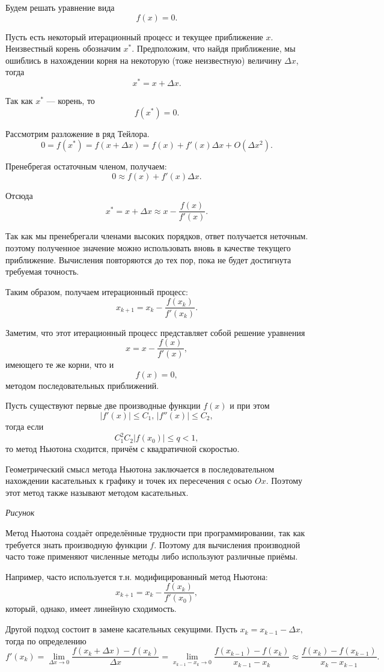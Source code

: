 Будем решать уравнение вида 
\[
f(x)=0.
\]


Пусть есть некоторый итерационный процесс и текущее приближение $x$.
Неизвестный корень обозначим $x^{*}$. Предположим, что найдя приближение,
мы ошиблись в нахождении корня на некоторую (тоже неизвестную) величину
$\Delta x$, тогда
\[
x^{*}=x+\Delta x.
\]


Так как $x^{*}$ — корень, то
\[
f(x^{*})=0.
\]


Рассмотрим разложение в ряд Тейлора.
\[
0=f(x^{*})=f(x+\Delta x)=f(x)+f'(x)\Delta x+O(\Delta x^{2}).
\]


Пренебрегая остаточным членом, получаем:
\[
0\approx f(x)+f'(x)\Delta x.
\]


Отсюда
\[
x^{*}=x+\Delta x\approx x-\frac{f(x)}{f'(x)}.
\]


Так как мы пренебрегали членами высоких порядков, ответ получается
неточным. поэтому полученное значение можно использовать вновь в качестве
текущего приближение. Вычисления повторяются до тех пор, пока не будет
достигнута требуемая точность.

Таким образом, получаем итерационный процесс:
\[
x_{k+1}=x_{k}-\frac{f(x_{k})}{f'(x_{k})}.
\]


Заметим, что этот итерационный процесс представляет собой решение
уравнения
\[
x=x-\frac{f(x)}{f'(x)},
\]
имеющего те же корни, что и
\[
f(x)=0,
\]
методом последовательных приближений.
\begin{thm}
Пусть существуют первые две производные функции $f(x)$ и при этом
\[
|f'(x)|\leqslant C_{1},\,|f''(x)|\leqslant C_{2},
\]
тогда если
\[
C_{1}^{2}C_{2}|f(x_{0})|\leqslant q<1,
\]
то метод Ньютона сходится, причём с квадратичной скоростью.
\end{thm}
Геометрический смысл метода Ньютона заключается в последовательном
нахождении касательных к графику и точек их пересечения с осью $Ox$.
Поэтому этот метод также называют методом касательных.

\emph{Рисунок}

Метод Ньютона создаёт определённые трудности при программировании,
так как требуется знать производную функции $f$. Поэтому для вычисления
производной часто тоже применяют численные методы либо используют
различные приёмы.

Например, часто используется т.н. модифицированный метод Ньютона:
\[
x_{k+1}=x_{k}-\frac{f(x_{k})}{f'(x_{0})},
\]
который, однако, имеет линейную сходимость.

Другой подход состоит в замене касательных секущими. Пусть $x_{k}=x_{k-1}-\Delta x,$
тогда по определению
\[
f'(x_{k})=\lim_{\Delta x\rightarrow0}\frac{f(x_{k}+\Delta x)-f(x_{k})}{\Delta x}=\lim_{x_{k-1}-x_{k}\rightarrow0}\frac{f(x_{k-1})-f(x_{k})}{x_{k-1}-x_{k}}\approx\frac{f(x_{k})-f(x_{k-1})}{x_{k}-x_{k-1}}.
\]


